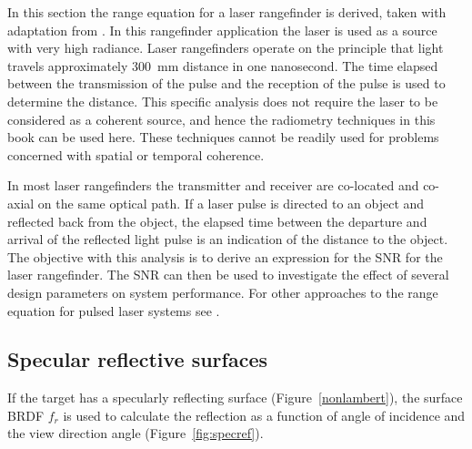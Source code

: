 

\noindent
In this section the range equation for a laser rangefinder is derived, taken with adaptation from \cite{Willers2013}. In this rangefinder application  the laser is used as a source with very high radiance. Laser rangefinders operate on the principle that light travels approximately 300~mm distance in one nanosecond. The time elapsed between the transmission of the pulse and the reception of the pulse is used to determine the distance. This specific analysis does not require the laser to be considered as a coherent source, and hence the radiometry techniques in this book can be used here. These techniques cannot be readily used for problems concerned with spatial or temporal coherence.

In most laser rangefinders the transmitter and receiver are co-located and co-axial on the same optical path. If a laser pulse
is directed to an object and reflected back from the object, the elapsed time between the departure and arrival of the reflected light pulse is an indication of the distance to the object. The objective with this analysis is to derive an expression for the SNR for the laser rangefinder. The  SNR can then be used to investigate the effect of several design parameters on system performance. For other approaches to the range equation for pulsed laser systems see \cite{Kaminski1980,Barbaric2003ieee,Barbaric2003t,Manojlovic2009}.


\subsection{Specular reflective surfaces}
\label{rfdetectpaint}

\noindent
{}If the target has a specularly reflecting surface (Figure~\ref{nonlambert}), the surface BRDF $f_r$ is used to calculate the reflection as a function of angle of incidence and the view direction angle (Figure~\ref{fig:specref}).

